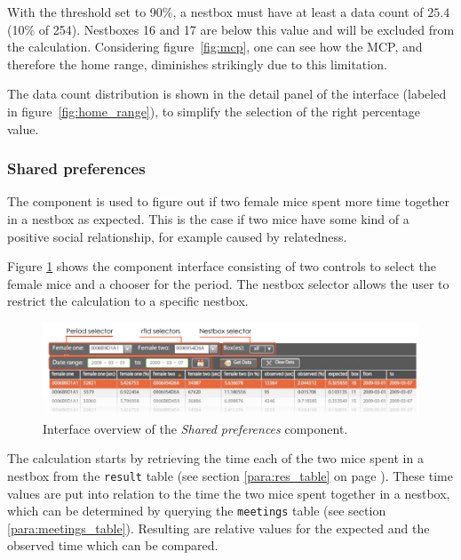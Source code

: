 
With the threshold set to 90\%, a nestbox must have at least a data count of $25.4$ (10\% of 254). Nestboxes 16 and 17 are below this value and will be excluded from the calculation. Considering figure~\ref{fig:mcp}, one can see how the MCP, and therefore the home range, diminishes strikingly due to this limitation. 

The data count distribution is shown in the detail panel of the interface (labeled in figure~\ref{fig:home_range}), to simplify the selection of the right percentage value.     

\subsubsection{Shared preferences}
\label{subsubsec:sharedpref}

The component is used to figure out if two female mice spent more time together in a nestbox as expected. This is the case if two mice have some kind of a positive social relationship, for example caused by relatedness.

Figure \ref{fig:shared_pref} shows the component interface consisting of two controls to select the female mice and a chooser for the period. The nestbox selector allows the user to restrict the calculation to a specific nestbox.

\begin{figure}[htpb]
\begin{center}
  \includegraphics[width=\textwidth]{assets/pdf/shared_pref.pdf}
  \caption[\textit{Shared preferences} component interface overview]{Interface overview of the \textit{Shared preferences} component.}
  \label{fig:shared_pref}
\end{center}
\end{figure}

The calculation starts by retrieving the time each of the two mice spent in a nestbox from the \lstinline|result| table (see section \ref{para:res_table} on page \pageref{para:res_table}). These time values are put into relation to the time the two mice spent together in a nestbox, which can be determined by querying the \lstinline|meetings| table (see section \ref{para:meetings_table}). Resulting are relative values for the expected and the observed time which can be compared. 

